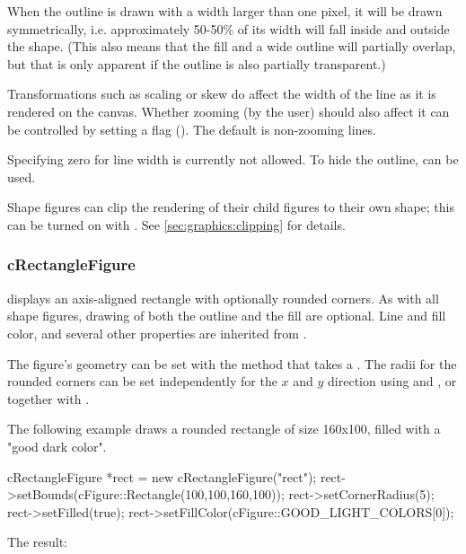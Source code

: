 When the outline is drawn with a width larger than one pixel, it will be
drawn symmetrically, i.e. approximately 50-50\% of its width will fall
inside and outside the shape. (This also means that the fill and a wide
outline will partially overlap, but that is only apparent if the
outline is also partially transparent.)

Transformations such as scaling or skew do affect the width of the line as it
is rendered on the canvas. Whether zooming (by the user) should also affect
it can be controlled by setting a flag ().
The default is non-zooming lines.

Specifying zero for line width is currently not allowed. To hide the outline,
 can be used.

Shape figures can clip the rendering of their child figures to their own
shape; this can be turned on with . See
\ref{sec:graphics:clipping} for details.


\subsubsection{cRectangleFigure}
\label{sec:graphics:rectanglefigure}

 displays an axis-aligned rectangle with
optionally rounded corners. As with all shape figures, drawing of both the
outline and the fill are optional. Line and fill color, and several other
properties are inherited from .

The figure's geometry can be set with the  method that
takes a . The radii for the rounded corners can
be set independently for the $x$ and $y$ direction using
 and , or together with
.

The following example draws a rounded rectangle of size 160x100, filled with
a "good dark color".

\begin{cpp}
cRectangleFigure *rect = new cRectangleFigure("rect");
rect->setBounds(cFigure::Rectangle(100,100,160,100));
rect->setCornerRadius(5);
rect->setFilled(true);
rect->setFillColor(cFigure::GOOD_LIGHT_COLORS[0]);
\end{cpp}


The result:

